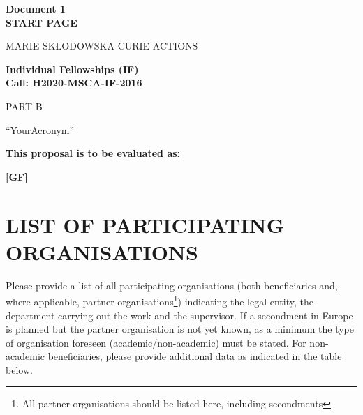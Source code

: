\documentclass[a4paper,11pt]{article}
\newcommand{\acronym}{{\sc YourAcronym}\xspace}
\begin{document}
\phantom{a}
\vspace{15mm}
\begin{center}


        \Large{
      
     
        \textbf{Document 1\\\vspace{15mm}START PAGE}
  
          \vspace{15mm}
          MARIE SK\L{}ODOWSKA-CURIE ACTIONS\\
          \vspace{1cm}
          
          \textbf{Individual Fellowships (IF)}\\
          \textbf{Call: H2020-MSCA-IF-2016}
          \vspace{2cm}                   

          PART B
          \vspace{2.5cm}

          ``\acronym''
          \vspace{2cm}

          \textbf{This proposal is to be evaluated as:}
          \vspace{.5cm}

          \textbf{[GF]}
        }

  \end{center}
\vspace{1cm}

\newpage
\tableofcontents


\newpage

\section*{LIST OF PARTICIPATING ORGANISATIONS}
\label{sec:participants}

Please provide a list of all participating organisations (both beneficiaries and, where applicable, partner organisations\footnote{All partner organisations should be listed here, including secondments}) indicating the legal entity, the department carrying out the work and the supervisor. 
If a secondment in Europe is planned but the partner organisation is not yet known, as a minimum the type of organisation foreseen (academic/non-academic) must be stated.
For non-academic beneficiaries, please provide additional data as indicated in the table below.
\end{document}
